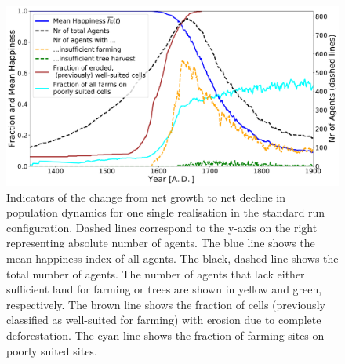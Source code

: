 \begin{figure}
	\centering
	\includegraphics[width=\textwidth]{images/Results/Standard/StandardsecondaryStats}
	\caption{
		Indicators of the change from net growth to net decline in population dynamics for one single realisation in the standard run configuration.
	Dashed lines correspond to the y-axis on the right representing absolute number of agents.
	The blue line shows the mean happiness index of all agents. The black, dashed line shows the total number of agents. The number of agents that lack either sufficient land for farming or trees are shown in yellow and green, respectively. The brown line shows the fraction of cells (previously classified as well-suited for farming) with erosion due to complete deforestation. The cyan line shows the fraction of farming sites on poorly suited sites.}
	\label{fig:STDsecondayrstats}
\end{figure}




